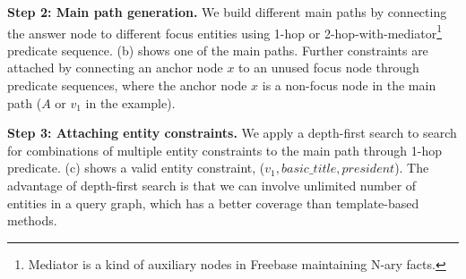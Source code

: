 \textbf{Step 2: Main path generation.}
We build different main paths by connecting the answer node to different focus entities
using 1-hop or 2-hop-with-mediator\footnote{
Mediator is a kind of auxiliary nodes in Freebase maintaining N-ary facts.}
predicate sequence.
(b) shows one of the main paths.
Further constraints are attached by
connecting an anchor node $x$ to an unused focus node through predicate sequences,
where the anchor node $x$ is a non-focus node in the main path
($A$ or $v_1$ in the example).

\textbf{Step 3: Attaching entity constraints.}
We apply a depth-first search to search for combinations of
multiple entity constraints to the main path through 1-hop predicate.
(c) shows a valid entity constraint, ($v_1, basic\_title, president$).
The advantage of depth-first search is that we can involve unlimited number of entities
in a query graph, which has a better coverage than template-based methods.


